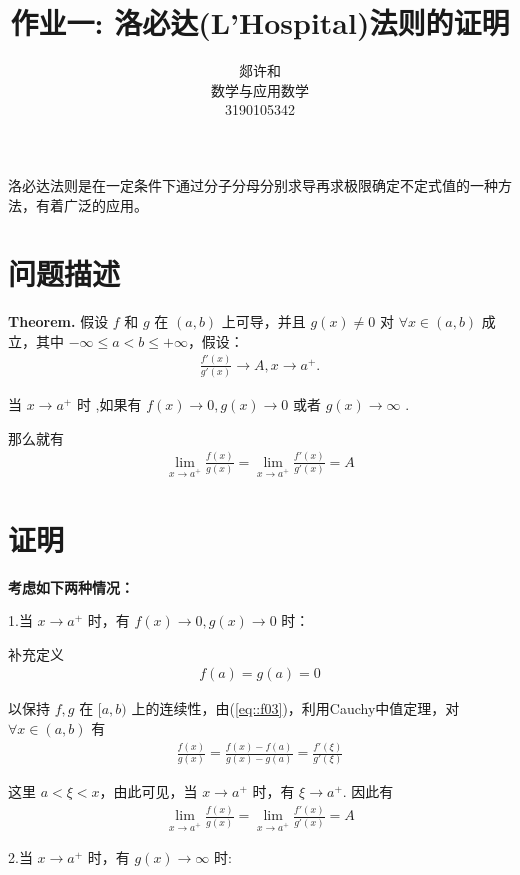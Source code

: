 \documentclass{ctexart}
\title{作业一: 洛必达(L'Hospital)法则的证明}
\author{郯许和 \\ 数学与应用数学 \\ 3190105342}
\begin{document}
\maketitle

洛必达法则是在一定条件下通过分子分母分别求导再求极限确定不定式值的一种方法，有着广泛的应用。
\section{问题描述}
{\bf Theorem.} 假设 $f$ 和 $g$ 在 $(a,b)$ 上可导，并且 $g(x) \neq 0$ 对 $\forall x \in (a,b)$ 成立，其中 $-\infty \leq a < b \leq +\infty $，假设：
\begin{align}
  \frac{f'(x)}{g'(x)} \rightarrow A , x \rightarrow a^{+}.
  \label{eq::f01}
\end{align}

当 $x \rightarrow a^{+}$ 时 ,如果有 $f(x) \rightarrow 0 ,g(x) \rightarrow 0 $ 或者 $g(x) \rightarrow \infty $ .

那么就有
\begin{align}
  \lim _{x \rightarrow a^{+}} \frac{f(x)}{g(x)} = \lim _{x \rightarrow a^{+}} \frac{f'(x)}{g'(x)} = A
  \label{eq::f02}
\end{align}


\section{证明}

{\bf 考虑如下两种情况：}

1.当 $x \rightarrow a^{+}$ 时，有 $f(x) \rightarrow 0 ,g(x) \rightarrow 0 $ 时：

补充定义
\begin{align}
  f(a) = g(a) =0
  \label{eq::f03}
\end{align}

以保持 $f,g$ 在 $[a,b)$ 上的连续性，由(\ref{eq::f03})，利用Cauchy中值定理，对 $\forall x \in (a,b)$ 有
\begin{align}
  \frac{f(x)}{g(x)} = \frac{f(x)-f(a)}{g(x)-g(a)} = \frac{f'(\xi)}{g'(\xi)}
  \label{eq::f04}
\end{align}

这里 $a<\xi <x$，由此可见，当 $x\rightarrow a^{+}$ 时，有 $\xi \rightarrow a^{+}$. 因此有
\begin{align}
  \lim _{x \rightarrow a^{+}} \frac{f(x)}{g(x)} = \lim _{x \rightarrow a^{+}} \frac{f'(x)}{g'(x)} = A
  \label{eq::f05}
\end{align}

2.当 $x \rightarrow a^{+}$ 时，有 $g(x) \rightarrow \infty $ 时:
\end{document}
